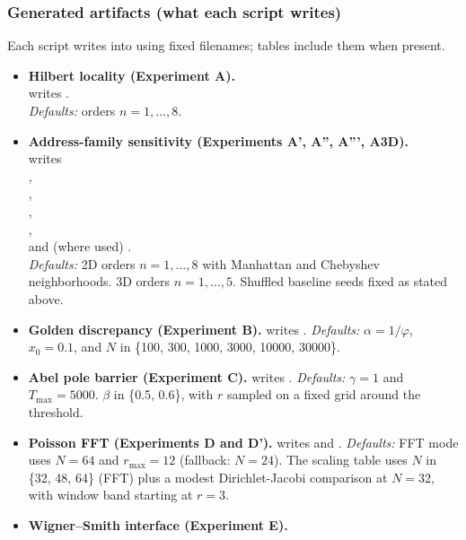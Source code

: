 \subsubsection*{Generated artifacts (what each script writes)}
Each script writes into  using fixed filenames; tables include them when present.
{\small
\begin{itemize}
\item \textbf{Hilbert locality (Experiment A).}\\
 writes .\\
\emph{Defaults:} orders $n=1,\dots,8$.
\item \textbf{Address-family sensitivity (Experiments A', A'', A''', A3D).}\\
 writes\\
,\\
,\\
,\\
,\\
and (where used) .\\
\emph{Defaults:} 2D orders $n=1,\dots,8$ with Manhattan and Chebyshev neighborhoods.
3D orders $n=1,\dots,5$.
Shuffled baseline seeds fixed as stated above.
\item \textbf{Golden discrepancy (Experiment B).}
 writes .
\emph{Defaults:} $\alpha=1/\varphi$, $x_0=0.1$, and $N$ in \{100, 300, 1000, 3000, 10000, 30000\}.
\item \textbf{Abel pole barrier (Experiment C).}
 writes .
\emph{Defaults:} $\gamma=1$ and $T_{\max}=5000$.
$\beta$ in \{0.5, 0.6\}, with $r$ sampled on a fixed grid around the threshold.
\item \textbf{Poisson FFT (Experiments D and D').}
 writes  and .
\emph{Defaults:} FFT mode uses $N=64$ and $r_{\max}=12$ (fallback: $N=24$).
The scaling table uses $N$ in \{32, 48, 64\} (FFT) plus a modest Dirichlet-Jacobi comparison at $N=32$, with window band starting at $r=3$.
\item \textbf{Wigner--Smith interface (Experiment E).}\\

\end{itemize}}
